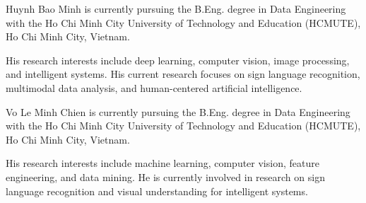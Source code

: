 \documentclass{ieeeaccess}
\begin{document}
\vspace{-8pt}

\begin{IEEEbiographynophoto}{Huynh Bao Minh}
is currently pursuing the B.Eng. degree in Data Engineering with the Ho Chi Minh
City University of Technology and Education (HCMUTE), Ho Chi Minh City,
Vietnam.

His research interests include deep learning, computer vision, image
processing, and intelligent systems. His current research focuses on sign
language recognition, multimodal data analysis, and human-centered artificial
intelligence.
\end{IEEEbiographynophoto}

\vspace{-8pt}

\begin{IEEEbiographynophoto}{Vo Le Minh Chien}
is currently pursuing the B.Eng. degree in Data Engineering with the Ho Chi Minh
City University of Technology and Education (HCMUTE), Ho Chi Minh City,
Vietnam.

His research interests include machine learning, computer vision, feature
engineering, and data mining. He is currently involved in research on sign
language recognition and visual understanding for intelligent systems.
\end{IEEEbiographynophoto}

\EOD
\end{document}
